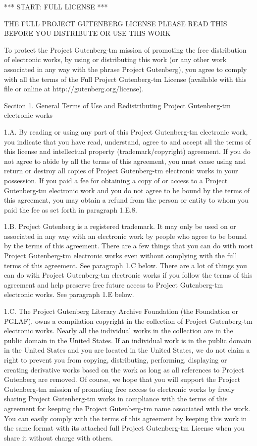 \documentclass{article}
\begin{document}
*** START: FULL LICENSE ***

THE FULL PROJECT GUTENBERG LICENSE
PLEASE READ THIS BEFORE YOU DISTRIBUTE OR USE THIS WORK

To protect the Project Gutenberg-tm mission of promoting the free
distribution of electronic works, by using or distributing this work
(or any other work associated in any way with the phrase Project
Gutenberg), you agree to comply with all the terms of the Full Project
Gutenberg-tm License (available with this file or online at
http://gutenberg.org/license).


Section 1.  General Terms of Use and Redistributing Project Gutenberg-tm
electronic works

1.A.  By reading or using any part of this Project Gutenberg-tm
electronic work, you indicate that you have read, understand, agree to
and accept all the terms of this license and intellectual property
(trademark/copyright) agreement.  If you do not agree to abide by all
the terms of this agreement, you must cease using and return or destroy
all copies of Project Gutenberg-tm electronic works in your possession.
If you paid a fee for obtaining a copy of or access to a Project
Gutenberg-tm electronic work and you do not agree to be bound by the
terms of this agreement, you may obtain a refund from the person or
entity to whom you paid the fee as set forth in paragraph 1.E.8.

1.B.  Project Gutenberg is a registered trademark.  It may only be
used on or associated in any way with an electronic work by people who
agree to be bound by the terms of this agreement.  There are a few
things that you can do with most Project Gutenberg-tm electronic works
even without complying with the full terms of this agreement.  See
paragraph 1.C below.  There are a lot of things you can do with Project
Gutenberg-tm electronic works if you follow the terms of this agreement
and help preserve free future access to Project Gutenberg-tm electronic
works.  See paragraph 1.E below.

1.C.  The Project Gutenberg Literary Archive Foundation (the Foundation
or PGLAF), owns a compilation copyright in the collection of Project
Gutenberg-tm electronic works.  Nearly all the individual works in the
collection are in the public domain in the United States.  If an
individual work is in the public domain in the United States and you are
located in the United States, we do not claim a right to prevent you from
copying, distributing, performing, displaying or creating derivative
works based on the work as long as all references to Project Gutenberg
are removed.  Of course, we hope that you will support the Project
Gutenberg-tm mission of promoting free access to electronic works by
freely sharing Project Gutenberg-tm works in compliance with the terms of
this agreement for keeping the Project Gutenberg-tm name associated with
the work.  You can easily comply with the terms of this agreement by
keeping this work in the same format with its attached full Project
Gutenberg-tm License when you share it without charge with others.
\end{document}
